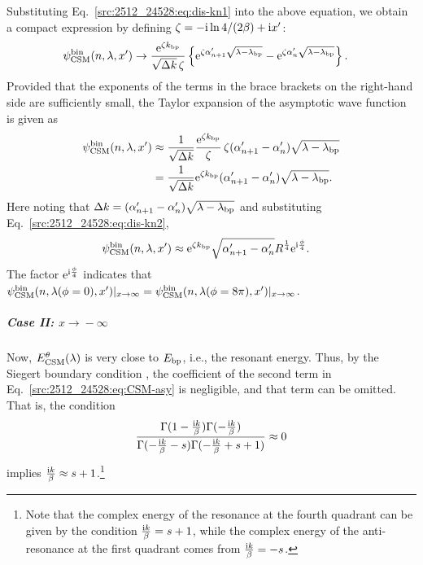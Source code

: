     Substituting Eq.~\eqref{src:2512_24528:eq:dis-kn1} into the above equation, we obtain a compact expression by defining
    $\zeta=-\mathrm{i} \ln4/(2\beta)+\mathrm{i} x'$:
    \begin{align}
        \psi^{\mathrm{bin}}_{\mathrm{CSM}}(n,\lambda,x')
        &\to\frac{\mathrm{e}^{\zeta k_{\mathrm{bp}}}}
        {\sqrt{\Delta k}\,\zeta}
        \left\{
        \mathrm{e}^{\zeta\alpha'_{n+1}\sqrt{\lambda-\lambda_{\mathrm{bp}}}}
        -\mathrm{e}^{\zeta\alpha'_{n}\sqrt{\lambda-\lambda_{\mathrm{bp}}}}
        \right\}.
        \label{src:2512_24528:eq:psi_inf_asymp_lambda}
    \end{align}
    Provided that the exponents of the terms in the brace brackets on the right-hand side are sufficiently small, the Taylor expansion of the asymptotic wave function is given as
    \begin{align}
        \psi^{\mathrm{bin}}_{\mathrm{CSM}}(n,\lambda,x') &\approx\frac{1}{\sqrt{\Delta k}}
        \frac{\mathrm{e}^{\zeta k_{\mathrm{bp}}}}{\zeta}\,\zeta
        (\alpha'_{n+1}-\alpha'_n)\sqrt{\lambda-\lambda_{\mathrm{bp}}} \notag\\
        &= \frac{1}{\sqrt{\Delta k}}
        \mathrm{e}^{\zeta k_{\mathrm{bp}}}
        (\alpha'_{n+1}-\alpha'_n)\sqrt{\lambda-\lambda_{\mathrm{bp}}}.
    \end{align}
    Here noting that $\Delta k=(\alpha'_{n+1}-\alpha'_n)\sqrt{\lambda-\lambda_{\mathrm{bp}}}$ and substituting Eq.~\eqref{src:2512_24528:eq:dis-kn2},
    \begin{align}
        \psi^{\mathrm{bin}}_{\mathrm{CSM}}(n,\lambda,x') &\approx \mathrm{e}^{\zeta k_{\mathrm{bp}}}\sqrt{\alpha'_{n+1}-\alpha'_n}R^{\frac{1}{4}}\mathrm{e}^{\mathrm{i} \frac{\phi}{4}} .
        \label{src:2512_24528:eq:psi_inf_asymp}
    \end{align}
    The factor $\mathrm{e}^{\mathrm{i} \frac{\phi}{4}}$ indicates that $\psi^{\mathrm{bin}}_{\mathrm{CSM}}(n,\lambda(\phi=0),x')|_{x\to\infty}=\psi^{\mathrm{bin}}_{\mathrm{CSM}}(n,\lambda(\phi=8\pi),x')|_{x\to\infty}$.
\subparagraph{\textbf{Case II:} $x\xrightarrow{}-\infty$}
    Now, $E^\theta_{\mathrm{CSM}}(\lambda)$ is very close to $E_{\mathrm{bp}}$, i.e., the resonant energy. Thus, by the Siegert boundary condition \cite{Siegert:1939}, the coefficient of the second term in Eq.~\eqref{src:2512_24528:eq:CSM-asy} is negligible, and that term can be omitted. That is, the condition 
    \begin{align}
        \frac{\Gamma(1-\frac{\mathrm{i} k}{\beta})\Gamma(-\frac{\mathrm{i} k}{\beta})}{\Gamma(-\frac{\mathrm{i} k}{\beta}-s)\Gamma(-\frac{\mathrm{i} k}{\beta}+s+1)}\approx0 
    \end{align}
    implies $\frac{\mathrm{i} k}{\beta}\approx s+1$.\footnote{Note that the complex energy of the resonance at the fourth quadrant can be given by the condition $\frac{\mathrm{i} k}{\beta}=s+1$, while the complex energy of the anti-resonance at the first quadrant comes from $\frac{\mathrm{i} k}{\beta}=-s$.}

